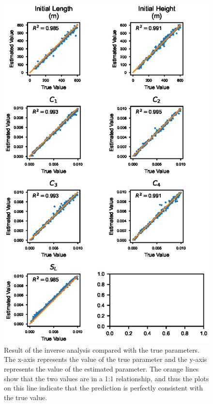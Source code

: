 \begin{figure}[t]
  \includegraphics[width=12cm]{fig07.eps}
  \caption{Result of the inverse analysis compared with the true parameters. The x-axis represents the value of the true parameter and the y-axis represents the value of the estimated parameter. The orange lines show that the two values are in a 1:1 relationship, and thus the plots on this line indicate that the prediction is perfectly consistent with the true value.}
  \label{fig:test_scatter_plot}
\end{figure}

